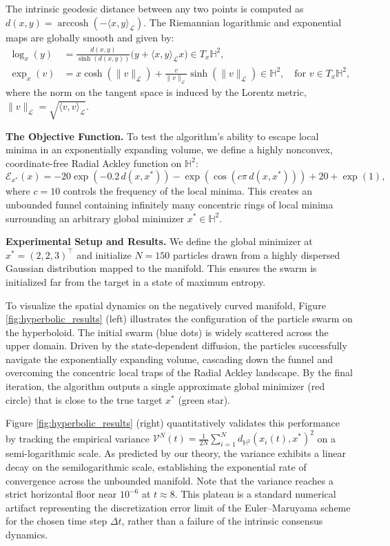 \documentclass[11pt]{amsart}
\begin{document}
The intrinsic geodesic distance between any two points is computed as $d(x,y) = \operatorname{arccosh}(-\langle x, y \rangle_{\mathcal{L}})$. The Riemannian logarithmic and exponential maps are globally smooth and given by:
\begin{align*}
    \log_x(y) &= \frac{d(x,y)}{\sinh(d(x,y))} \big(y + \langle x, y \rangle_{\mathcal{L}} x\big) \in T_x\mathbb{H}^2, \\
    \exp_x(v) &= x \cosh(\|v\|_{\mathcal{L}}) + \frac{v}{\|v\|_{\mathcal{L}}} \sinh(\|v\|_{\mathcal{L}}) \in \mathbb{H}^2, \quad \text{for } v \in T_x\mathbb{H}^2,
\end{align*}
where the norm on the tangent space is induced by the Lorentz metric, $\|v\|_{\mathcal{L}} = \sqrt{\langle v, v \rangle_{\mathcal{L}}}$.

\textbf{The Objective Function.}
To test the algorithm's ability to escape local minima in an exponentially expanding volume, we define a highly nonconvex, coordinate-free Radial Ackley function on $\mathbb{H}^2$:
\begin{equation*}
    \mathcal{E}_{x^*}(x) = -20 \exp\left(-0.2 \, d(x, x^*)\right) - \exp\left(\cos(c \pi \, d(x, x^*))\right) + 20 + \exp(1),
\end{equation*}
where $c = 10$ controls the frequency of the local minima. This creates an unbounded funnel containing infinitely many concentric rings of local minima surrounding an arbitrary global minimizer $x^* \in \mathbb{H}^2$.

\textbf{Experimental Setup and Results.}
We define the global minimizer at $x^* = (2, 2, 3)^\top$ and initialize $N = 150$ particles drawn from a highly dispersed Gaussian distribution mapped to the manifold. This ensures the swarm is initialized far from the target in a state of maximum entropy. 

To visualize the spatial dynamics on the negatively curved manifold, Figure \ref{fig:hyperbolic_results} (left)  illustrates the configuration of the particle swarm on the hyperboloid. The initial swarm (blue dots) is widely scattered across the upper domain. Driven by the state-dependent diffusion, the particles successfully navigate the exponentially expanding volume, cascading down the funnel and overcoming the concentric local traps of the Radial Ackley landscape. By the final iteration, the algorithm outputs a single approximate global minimizer (red circle) that is close to the true target $x^*$ (green star).

Figure \ref{fig:hyperbolic_results} (right) quantitatively validates this performance by tracking the empirical variance $\mathcal{V}^N(t) = \frac{1}{2N} \sum_{i=1}^N d_{\mathbb{H}^2}(x_i(t), x^*)^2$ on a semi-logarithmic scale. As predicted by our theory, the variance exhibits a  linear decay on the semilogarithmic scale, establishing the exponential rate of convergence across the unbounded manifold. Note that the variance reaches a strict horizontal floor near $10^{-6}$ at $t \approx 8$. This plateau is a standard numerical artifact representing the discretization error limit of the Euler--Maruyama scheme for the chosen time step $\Delta t$, rather than a failure of the intrinsic consensus dynamics.
\end{document}
